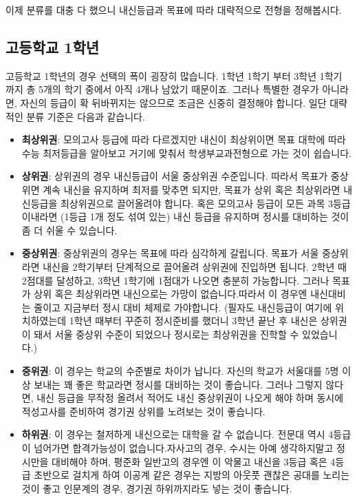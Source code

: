 \documentclass[final]{IEEEphot}
\begin{document}
이제 분류를 대충 다 했으니 내신등급과 목표에 따라 대략적으로 전형을 정해봅시다.

\subsection{고등학교 1학년}

\hspace{0.3cm} 고등학교 1학년의 경우 선택의 폭이 굉장히 많습니다. 1학년 1학기 부터 3학년 1학기 까지 총 5개의 학기 중에서 아직 4개나 남았기 때문이죠. 그러나 특별한 경우가 아니라면, 자신의 등급이
확 뒤바뀌지는 않으므로 조금은 신중히 결정해야 합니다. 일단 대략적인 분류 기준은 다음과 같습니다.

\begin{itemize}
 \item \textbf{최상위권}: 모의고사 등급에 따라 다르겠지만 내신이 최상위이면 목표 대학에 따라 수능 최저등급을 알아보고 거기에 맞춰서 학생부교과전형으로 가는 것이 쉽습니다. \vspace{0.1cm}
 \item \textbf{상위권}: 상위권의 경우 내신등급이 서울 중상위권 수준입니다. 따라서 목표가 중상위면 계속 내신을 유지하며 최저를 맞추면 되지만, 목표가 상위 혹은 최상위라면 내신등급을 최상위권으로 끌어올려야 합니다. 
 혹은 모의고사 등급이 모든 과목 3등급 이내라면 (1등급 1개 정도 섞여 있는) 내신 등급을 유지하며 정시를 대비하는 것이 좀 더 쉬울 수 있습니다. \vspace{0.1cm}
 \item \textbf{중상위권}: 중상위권의 경우는 목표에 따라 심각하게 갈립니다. 목표가 서울 중상위라면 내신을 2학기부터 단계적으로 끌어올려 상위권에 진입하면 됩니다. 2학년 때 2점대를 달성하고, 3학년 1학기에 1점대가 나오면
 충분히 가능합니다. 그러나 목표가 상위 혹은 최상위라면 내신으로는 가망이 없습니다.\footnotemark 따라서 이 경우엔 내신대비는 줄이고 지금부터 정시 대비 체제로 가야합니다.
 (필자도 내신등급이 여기에 위치하였는데 1학년 때부터 꾸준히 정시준비를 했더니 3학년 끝난 후 내신은 상위권이 돼서 서울 중상위 수준이 되었으나 정시로는 최상위권을 진학할 수 있었습니다.) \vspace{0.1cm}
 \item \textbf{중위권}: 이 경우는 학교의 수준별로 차이가 납니다. 자신의 학교가 서울대를 5명 이상 보내는 꽤 좋은 학교라면 정시를 대비하는 것이 좋습니다. 그러나 그렇지 않다면, 내신 등급을 무작정 올려서 적어도
 내신 중상위권이 나오게 해야 하며 동시에 적성고사를 준비하여 경기권 상위를 노려보는 것이 좋습니다. \vspace{0.1cm}
 \item \textbf{하위권}: 이 경우는 철저하게 내신으로는 대학을 갈 수 없습니다. 전문대 역시 4등급이 넘어가면 합격가능성이 없습니다.\footnotemark 자사고의 경우, 수시는 아예 생각하지말고 정시만을 대비해야 하며, 평준화 일반고의 경우엔 
 이 악물고 내신을 3등급 혹은 4등급 초반으로 걸치게 하여 이공계 같은 경우는 지방의 아웃풋 괜찮은 공대를 노리는 것이 좋고 인문계의 경우, 경기권 하위까지라도 넣는 것이 좋습니다.
\end{itemize}
\end{document}
